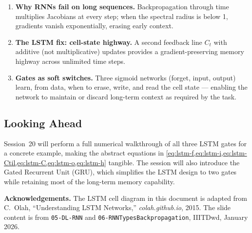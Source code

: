 \documentclass[12pt,a4paper]{article}
\begin{document}
\begin{keyinsight}[title=The Three Core Ideas of Session 19]
  \begin{enumerate}[nosep,label=\textbf{\arabic*.}]
    \item \textbf{Why RNNs fail on long sequences.} Backpropagation
          through time multiplies Jacobians at every step; when the
          spectral radius is below 1, gradients vanish exponentially,
          erasing early context.
    \item \textbf{The LSTM fix: cell-state highway.} A second feedback
          line $C_t$ with additive (not multiplicative) updates provides a
          gradient-preserving memory highway across unlimited time steps.
    \item \textbf{Gates as soft switches.} Three sigmoid networks
          (forget, input, output) learn, from data, when to erase, write,
          and read the cell state --- enabling the network to maintain or
          discard long-term context as required by the task.
  \end{enumerate}
\end{keyinsight}

\subsection{Looking Ahead}
\label{subsec:looking-ahead}

Session~20 will perform a full numerical walkthrough of all three LSTM
gates for a concrete example, making the abstract equations in
\cref{eq:lstm-f,eq:lstm-i,eq:lstm-Ctil,eq:lstm-C,eq:lstm-o,eq:lstm-h}
tangible. The session will also introduce the Gated Recurrent Unit (GRU),
which simplifies the LSTM design to two gates while retaining most of the
long-term memory capability.

\medskip
\noindent\textbf{Acknowledgements.} The LSTM cell diagram in this document
is adapted from C.\ Olah, ``Understanding LSTM Networks,''
\textit{colah.github.io}, 2015. The slide content is from
\texttt{05-DL-RNN} and \texttt{06-RNNTypesBackpropagation},
IIITDwd, January 2026.
\end{document}
